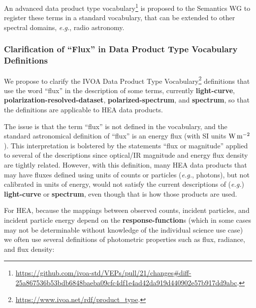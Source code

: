 \documentclass[11pt,a4paper]{ivoa}
\begin{document}
An advanced data product type vocabulary\footnote{\url{https://github.com/ivoa-std/VEPs/pull/21/changes\#diff-25a867536b53bdb6848baeba09cfc4df1e4ad42da919d440902e57b917dd9abc}.} is proposed to the Semantics WG to register these terms in a standard vocabulary, that can be extended to other spectral domains, {\em e.g.\/}, radio astronomy.  




%

\subsubsection{Clarification of ``Flux'' in Data Product Type Vocabulary Definitions}
\label{sec:flux}

We propose to clarify the IVOA Data Product Type Vocabulary\footnote{\url{https://www.ivoa.net/rdf/product_type}.} definitions that use the word ``flux'' in the description of some terms, currently {\bf light-curve}, {\bf polarization-resolved-dataset}, {\bf polarized-spectrum}, and {\bf spectrum}, so that the definitions are applicable to \gls{HEA} data products.

The issue is that the term ``flux'' is not defined in the vocabulary, and the standard astronomical definition of ``flux'' is an energy flux (with SI units $\rm W\,m^{-2}$).  This interpretation is bolstered by the statements ``flux or magnitude'' applied to several of the descriptions since optical/IR magnitude and energy flux density are tightly related.  However, with this definition, many \gls{HEA} data products that may have fluxes defined using units of counts or particles ({\em e.g.\/}, photons), but not calibrated in units of energy, would not satisfy the current  descriptions of ({\em e.g.\/}\null) {\bf light-curve} or {\bf spectrum}, even though that is how those products are used.

For \gls{HEA}, because the mappings between observed counts, incident particles, and incident particle energy depend on the {\bf response-function}s (which in some cases may not be determinable without knowledge of the individual science use case) we often use several definitions of photometric properties such as flux, radiance, and flux density:
\end{document}
